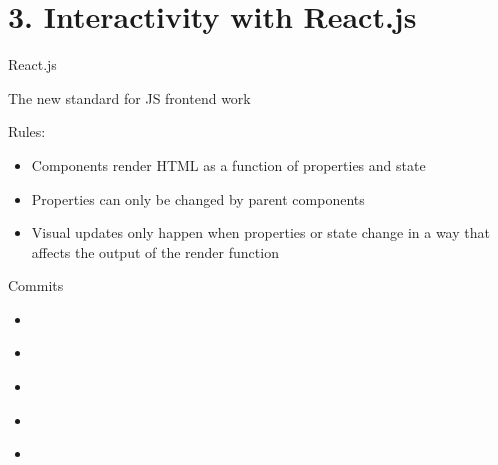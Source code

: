\documentclass[xcolor=svgnames,17pt]{beamer}
\begin{document}
\section{3. Interactivity with React.js}

\begin{frame}{}
\tableofcontents[currentsection]
\end{frame}

\begin{frame}{React.js}

The new standard for JS frontend work \\[1em] \pause

Rules:
\pause
\begin{itemize}
\item Components render HTML as a function of properties and state
\pause
\item Properties can only be changed by parent components
\pause
\item Visual updates only happen when properties or state change in a way
that affects the output of the render function
\end{itemize}

\end{frame}

\begin{frame}{Commits}
\begin{itemize}
\item \href{https://github.com/andrewdotn/django-react/commit/6dc5466a174ec3265c0590c33c2328316eb4c34d}{}
\pause
{}
\pause
\item \href{https://github.com/andrewdotn/django-react/commit/4ba8f0ad16afc44233c88e0b1bc62f2ca9674aa9}{}
\pause
\item \href{https://github.com/andrewdotn/django-react/commit/bec0411c648b2668f7977a75a461e11534073e0e}{}
\pause
{}
\pause
\item \href{https://github.com/andrewdotn/django-react/commit/243f7d4e5f7bde54fdeb147198cf21ed105560c7}{}
\pause
{}
\pause
\item \href{https://github.com/andrewdotn/django-react/commit/3e93a9cf1a2c8e772abf3a7913267cfeed6649de}{}
\pause
{}
\end{itemize}
\end{frame}
\end{document}
